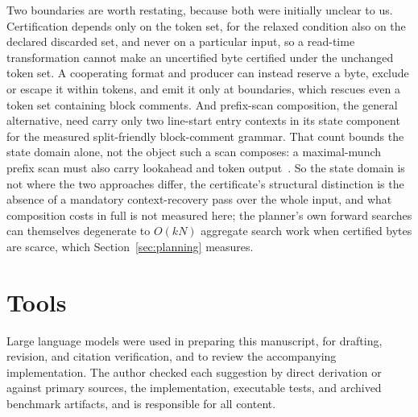 \documentclass[11pt,a4paper]{article}
\theoremstyle{definition}
\theoremstyle{plain}
\begin{document}
Two boundaries are worth restating, because both were initially unclear to us. Certification depends only on the token
set, for the relaxed condition also on the declared discarded set, and never on a particular input, so a read-time
transformation cannot make an uncertified byte certified under the unchanged token set. A cooperating format and
producer can instead reserve a byte, exclude or escape it within tokens, and emit it only at boundaries, which rescues
even a token set containing block comments. And prefix-scan composition, the general alternative, need carry only two
line-start entry contexts in its state component for the measured split-friendly block-comment grammar. That count
bounds the state domain alone, not the object such a scan composes: a maximal-munch prefix scan must also carry
lookahead and token output~\cite{yang1996mealy}. So the state domain is not where the two approaches differ, the
certificate's structural distinction is the absence of a mandatory context-recovery pass over the whole input, and
what composition costs in full is not measured here; the planner's own forward searches can themselves degenerate to
$O(kN)$ aggregate search work when certified bytes are scarce, which Section~\ref{sec:planning} measures.

\section*{Tools}

Large language models were used in preparing this manuscript, for drafting, revision, and citation verification, and
to review the accompanying implementation. The author checked each suggestion by direct derivation or against primary
sources, the implementation, executable tests, and archived benchmark artifacts, and is responsible for all content.

{\small


}
\end{document}
